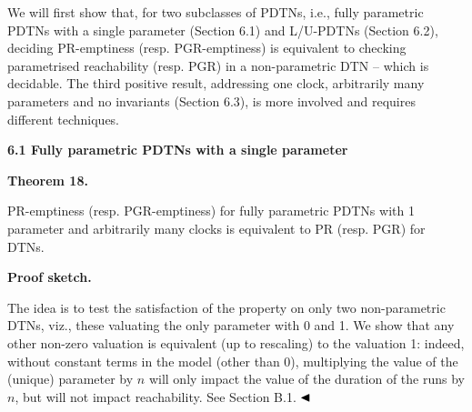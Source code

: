  
We will first show that, for two subclasses of PDTNs, i.e., fully parametric PDTNs with a single parameter (Section 6.1) and L/U-PDTNs (Section 6.2), deciding PR-emptiness (resp. PGR-emptiness) is equivalent to checking parametrised reachability (resp. PGR) in a non-parametric DTN -- which is decidable. The third positive result, addressing one clock, arbitrarily many parameters and no invariants (Section 6.3), is more involved and requires different techniques.\par
 
 
 
\par\medskip\noindent\textbf{6.1 Fully parametric PDTNs with a single parameter}\par
 
 
\par\medskip\noindent\textbf{Theorem 18.}\par
 
 
PR-emptiness (resp. PGR-emptiness) for fully parametric PDTNs with 1 parameter and arbitrarily many clocks is equivalent to PR (resp. PGR) for DTNs.\par
 
 
 
 
\par\medskip\noindent\textbf{Proof sketch.}\par
 
 
The idea is to test the satisfaction of the property on only two non-parametric DTNs, viz., these valuating the only parameter with 0 and 1. We show that any other non-zero valuation is equivalent (up to rescaling) to the valuation 1: indeed, without constant terms in the model (other than 0), multiplying the value of the (unique) parameter by $n$ will only impact the value of the duration of the runs by $n$, but will not impact reachability. See Section B.1. $\hfill\blacktriangleleft$\par
 
 
 
